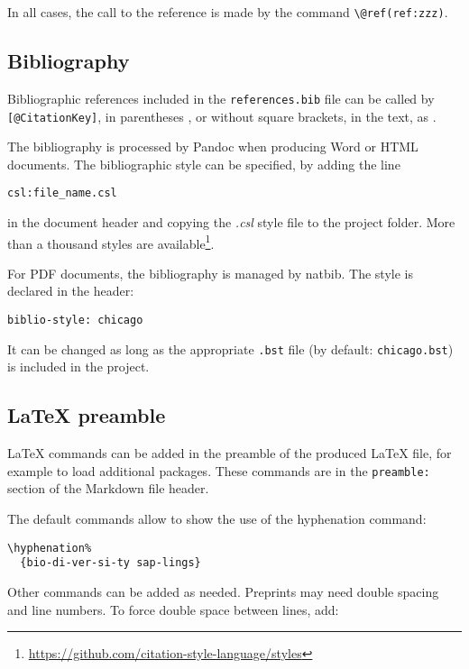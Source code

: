 \documentclass[fleqn,]{article} %
\begin{document}
In all cases, the call to the reference is made by the command \texttt{\textbackslash{}@ref(ref:zzz)}.

\hypertarget{bibliography}{%
\subsection{Bibliography}\label{bibliography}}

Bibliographic references included in the \texttt{references.bib} file can be called by \texttt{{[}@CitationKey{]}}, in parentheses \citep{Xie2016}, or without square brackets, in the text, as \citet{Xie2018} .

The bibliography is processed by Pandoc when producing Word or HTML documents.
The bibliographic style can be specified, by adding the line

\begin{verbatim}
csl:file_name.csl
\end{verbatim}

in the document header and copying the \emph{.csl} style file to the project folder.
More than a thousand styles are available\footnote{\url{https://github.com/citation-style-language/styles}}.

For PDF documents, the bibliography is managed by natbib.
The style is declared in the header:

\begin{verbatim}
biblio-style: chicago
\end{verbatim}

It can be changed as long as the appropriate \texttt{.bst} file (by default: \texttt{chicago.bst}) is included in the project.

\hypertarget{latex-preamble}{%
\subsection{LaTeX preamble}\label{latex-preamble}}

LaTeX commands can be added in the preamble of the produced LaTeX file, for example to load additional packages.
These commands are in the \texttt{preamble:} section of the Markdown file header.

The default commands allow to show the use of the hyphenation command:

\begin{verbatim}
\hyphenation%
  {bio-di-ver-si-ty sap-lings}
\end{verbatim}

Other commands can be added as needed.
Preprints may need double spacing and line numbers.
To force double space between lines, add:
\end{document}
